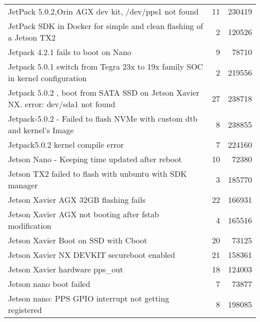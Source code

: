 \begin{longtable}{p{}rr}
    JetPack 5.0.2,Orin AGX dev kit, /dev/pps1 not found                                                 & 11      & 230419 \\
    JetPack SDK in Docker for simple and clean flashing of a Jetson TX2                                 & 2       & 120526 \\
    Jetpack 4.2.1 fails to boot on Nano                                                                 & 9       & 78710  \\
    Jetpack 5.0.1 switch from Tegra 23x to 19x family SOC in kernel configuration                       & 2       & 219556 \\
    Jetpack 5.0.2 , boot from SATA SSD on Jetson Xavier NX. error: dev/sda1 not found                   & 27      & 238718 \\
    Jetpack-5.0.2 - Failed to flash NVMe with custom dtb and kernel’s Image                             & 8       & 238855 \\
    Jetpack5.0.2 kernel compile error                                                                   & 7       & 224160 \\
    Jetson Nano - Keeping time updated after reboot                                                     & 10      & 72380  \\
    Jetson TX2 failed to flash with unbuntu with SDK manager                                            & 3       & 185770 \\
    Jetson Xavier AGX 32GB flashing fails                                                               & 22      & 166931 \\
    Jetson Xavier AGX not booting after fstab modification                                              & 4       & 165516 \\
    Jetson Xavier Boot on SSD with Cboot                                                                & 20      & 73125  \\
    Jetson Xavier NX DEVKIT secureboot enabled                                                          & 21      & 158361 \\
    Jetson Xavier hardware pps\_out                                                                     & 18      & 124003 \\
    Jetson nano boot failed                                                                             & 7       & 73877  \\
    Jetson nano: PPS GPIO interrupt not getting registered                                              & 8       & 198085 \\

\end{longtable}
